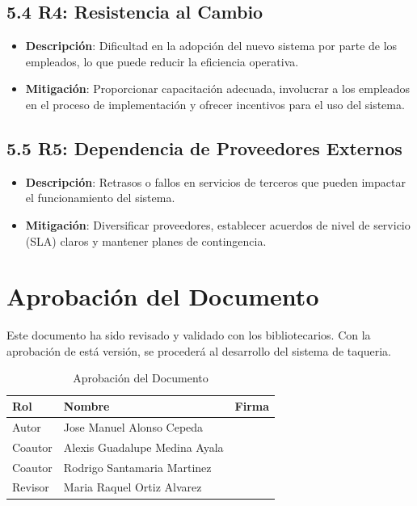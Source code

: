 \documentclass{article}
\begin{document}
\subsection{5.4 R4: Resistencia al Cambio}
\begin{itemize}
    \item \textbf{Descripción}: Dificultad en la adopción del nuevo sistema por parte de los empleados, lo que puede reducir la eficiencia operativa.
    \item \textbf{Mitigación}: Proporcionar capacitación adecuada, involucrar a los empleados en el proceso de implementación y ofrecer incentivos para el uso del sistema.
\end{itemize}

\subsection{5.5 R5: Dependencia de Proveedores Externos}
\begin{itemize}
    \item \textbf{Descripción}: Retrasos o fallos en servicios de terceros que pueden impactar el funcionamiento del sistema.
    \item \textbf{Mitigación}: Diversificar proveedores, establecer acuerdos de nivel de servicio (SLA) claros y mantener planes de contingencia.
\end{itemize}

\newpage
\section{Aprobación del Documento}
Este documento ha sido revisado y validado con los bibliotecarios. Con la aprobación de está versión, se
procederá al desarrollo del sistema de taqueria.

\begin{table}[h!]
\centering
\begin{tabular}{|p{4cm}|p{5cm}|p{5cm}|}
\hline
\textbf{Rol} & \textbf{Nombre} & \textbf{Firma} \\ \hline
Autor & Jose Manuel Alonso Cepeda & \\ \hline
Coautor & Alexis Guadalupe Medina Ayala & \\ \hline
Coautor & Rodrigo Santamaria Martinez & \\ \hline
Revisor & Maria Raquel Ortiz Alvarez & \\ \hline
\end{tabular}
\caption{Aprobación del Documento}
\label{tab:aprobacion_documento}
\end{table}
\end{document}
